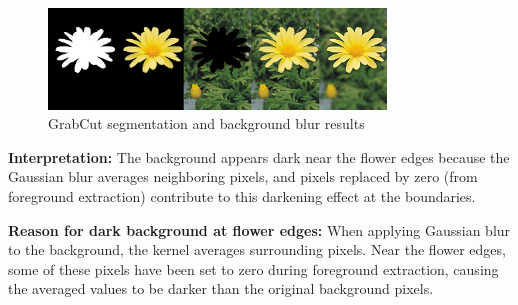 \documentclass[10pt,a4paper]{article}
\begin{document}
\begin{figure}[H]
    \centering
    \includegraphics[width=0.8\textwidth]{task9/q9_outputs.png}
    \caption{GrabCut segmentation and background blur results}
\end{figure}

\textbf{Interpretation:} The background appears dark near the flower edges because the Gaussian blur averages neighboring pixels, and pixels replaced by zero (from foreground extraction) contribute to this darkening effect at the boundaries.

\textbf{Reason for dark background at flower edges:} When applying Gaussian blur to the background, the kernel averages surrounding pixels. Near the flower edges, some of these pixels have been set to zero during foreground extraction, causing the averaged values to be darker than the original background pixels.
\end{document}
